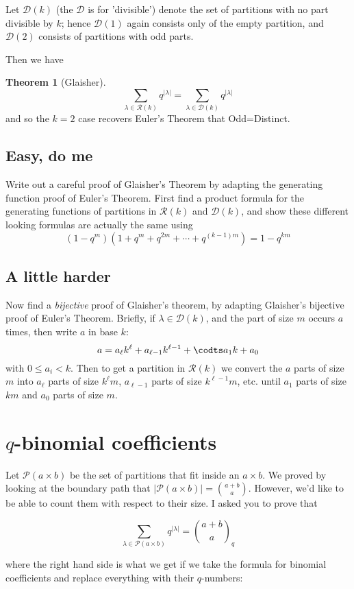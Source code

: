 \documentclass{article}
\theoremstyle{definition}
\newtheorem{theorem}[dummy]{Theorem}
\begin{document}
 Let $\mathcal{D}(k)$ (the $\mathcal{D}$ is for 'divisible') denote the set of partitions with no part divisible by $k$; hence $\mathcal{D}(1)$ again consists only of the empty partition, and $\mathcal{D}(2)$ consists of partitions with odd parts.  
 
 Then we have 
 \begin{theorem}[Glaisher]
$$\sum_{\lambda\in\mathcal{R}(k)}q^{|\lambda|}=\sum_{\lambda\in\mathcal{D}(k)}q^{|\lambda|}$$
and so the $k=2$ case recovers Euler's Theorem that Odd=Distinct.

\subsection{Easy, do me}
Write out a careful proof of Glaisher's Theorem by adapting the generating function proof of Euler's Theorem. First find a product formula for the generating functions of partitions in $\mathcal{R}(k)$ and $\mathcal{D}(k)$, and show these different looking formulas are actually the same using 
$$(1-q^m)(1+q^m+q^{2m}+\cdots+q^{(k-1)m})=1-q^{km}$$
\subsection{A little harder}
Now find a \emph{bijective} proof of Glaisher's theorem, by adapting Glaisher's bijective proof of Euler's Theorem.  Briefly, if $\lambda\in \mathcal{D}(k)$, and the part of size $m$ occurs $a$ times, then write $a$ in base $k$:
$$a=a_\ell k^\ell+a_{\ell-1} k^{\ell-1}+\codts a_1 k +a_0$$
with $0\leq a_i<k$.  Then to get a partition in $\mathcal{R}(k)$ we convert the $a$ parts of size $m$ into $a_\ell$ parts of size $k^\ell m$, $a_{\ell-1}$ parts of size $k^{\ell-1}m$, etc. until $a_1$ parts of size $km$ and $a_0$ parts of size $m$.

\section{$q$-binomial coefficients}

Let $\mathcal{P}(a\times b)$ be the set of partitions that fit inside an $a\times b$.   We proved by looking at the boundary path that $|\mathcal{P}(a\times b)|=\binom{a+b}{a}$.  However, we'd like to be able to count them with respect to their size.  I asked you to prove that

$$\sum_{\lambda\in\mathcal{P}(a\times b)} q^{|\lambda|}=\binom{a+b}{a}_q$$

where the right hand side is what we get if we take the formula for binomial coefficients and replace everything with their $q$-numbers:


\end{theorem}
\end{document}
